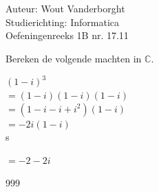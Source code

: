 \documentclass[a4paper]{article}
\begin{document}
  
\noindent \large Auteur: Wout Vanderborght\\
\noindent \large Studierichting: Informatica\\
\noindent \large Oefeningenreeks 1B nr. 17.11\\

\medskip

\normalsize

Bereken de volgende machten in $\mathbb{C}$.

$ (1-i)^3 $\\

$ = (1-i)(1-i)(1-i) $\\

$ = (1 - i -i +i^2)(1-i) $\\

$ = -2i(1-i) $\\s

$ = -2-2i $

\begin{thebibliography}{999}
\end{thebibliography}
\end{document}
